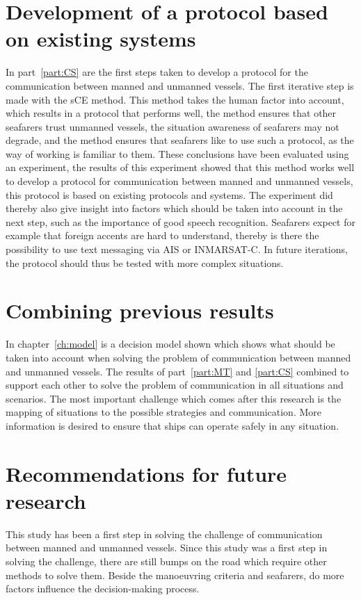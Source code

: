 \section{Development of a protocol based on existing systems}
In part~\ref{part:CS} are the first steps taken to develop a protocol for the communication between manned and unmanned vessels. The first iterative step is made with the \acf{sCE} method. This method takes the human factor into account, which results in a protocol that performs well, the method ensures that other seafarers trust unmanned vessels, the situation awareness of seafarers may not degrade, and the method ensures that seafarers like to use such a protocol, as the way of working is familiar to them. These conclusions have been evaluated using an experiment, the results of this experiment showed that this method works well to develop a protocol for communication between manned and unmanned vessels, this protocol is based on existing protocols and systems. The experiment did thereby also give insight into factors which should be taken into account in the next step, such as the importance of good speech recognition. Seafarers expect for example that foreign accents are hard to understand, thereby is there the possibility to use text messaging via AIS or INMARSAT-C. In future iterations, the protocol should thus be tested with more complex situations.

\section{Combining previous results}
In chapter~\ref{ch:model} is a decision model shown which shows what should be taken into account when solving the problem of communication between manned and unmanned vessels. The results of part~\ref{part:MT} and \ref{part:CS} combined to support each other to solve the problem of communication in all situations and scenarios. The most important challenge which comes after this research is the mapping of situations to the possible strategies and communication. More information is desired to ensure that ships can operate safely in any situation. 

\section{Recommendations for future research}
This study has been a first step in solving the challenge of communication between manned and unmanned vessels. Since this study was a first step in solving the challenge, there are still bumps on the road which require other methods to solve them. Beside the manoeuvring criteria and seafarers, do more factors influence the decision-making process.

